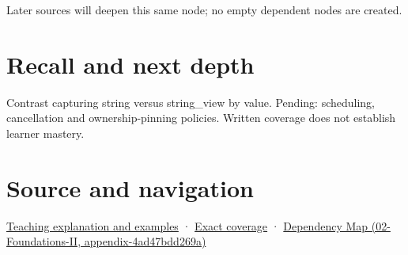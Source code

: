 Later sources will deepen this same node; no empty dependent nodes are created.

\section{Recall and next depth}\label{appendix-aea529eb5175-recall-and-next-depth}

Contrast capturing string versus string\_view by value. Pending: scheduling, cancellation and ownership-pinning policies. Written coverage does not establish learner mastery.

\section{Source and navigation}\label{appendix-aea529eb5175-source-and-navigation}

\href{Continuous\%20Notes/Computing\%20Foundations\%20-\%20From\%20Bits\%20to\%20C++\%20and\%20Systems\%20APIs\#Borrowed\%20views\%20and\%20deferred\%20work\%20need\%20an\%20owner\%20story}{Teaching explanation and examples} · \hyperref[appendix-fd090d982a15-m008---parts-113-126]{Exact coverage} · \href{../02-Foundations-II/main.pdf\#nameddest=appendix-4ad47bdd269a}{Dependency Map (02-Foundations-II, appendix-4ad47bdd269a)}
